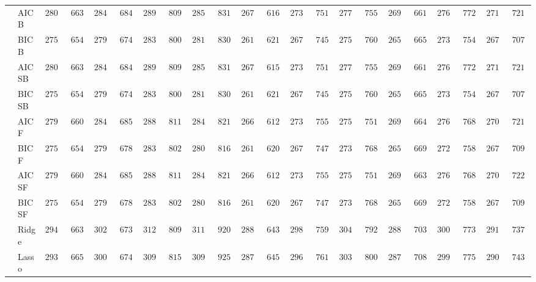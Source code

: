 \begin{tabular}{p{0.2cm}p{1cm}|p{0.6cm}p{0.6cm}|p{0.6cm}p{0.6cm}p{0.6cm}p{0.6cm}p{0.6cm}p{0.6cm}|p{0.6cm}p{0.6cm}p{0.6cm}p{0.6cm}p{0.6cm}p{0.6cm}|p{0.6cm}p{0.6cm}p{0.6cm}p{0.6cm}p{0.6cm}p{0.6cm}}
 & AIC B  & $2801.08$ & $663.10$ & $2847.87$ & $684.89$ & $2898.66$ & $809.57$ & $2857.72$ & $831.74$ & $2673.40$ & $616.50$ & $2738.28$ & $751.61$ & $2775.52$ & $755.02$ & $2699.04$ & $661.89$ & $2765.32$ & $772.39$ & $2714.70$ & $721.42$ \\
 & BIC B  & $2750.01$ & $654.65$ & $2796.68$ & $674.66$ & $2839.12$ & $800.56$ & $2819.68$ & $830.54$ & $2613.25$ & $621.72$ & $2675.47$ & $745.26$ & $2756.36$ & $760.71$ & $2656.22$ & $665.34$ & $2732.05$ & $754.82$ & $2677.76$ & $707.14$ \\
 & AIC SB  & $2801.08$ & $663.10$ & $2847.87$ & $684.89$ & $2898.66$ & $809.57$ & $2857.72$ & $831.74$ & $2674.60$ & $615.79$ & $2738.28$ & $751.61$ & $2775.52$ & $755.02$ & $2699.04$ & $661.89$ & $2765.32$ & $772.39$ & $2714.70$ & $721.42$ \\
 & BIC SB  & $2750.01$ & $654.65$ & $2796.68$ & $674.66$ & $2839.12$ & $800.56$ & $2819.68$ & $830.54$ & $2613.25$ & $621.72$ & $2675.73$ & $745.46$ & $2756.36$ & $760.71$ & $2656.22$ & $665.34$ & $2732.05$ & $754.82$ & $2677.76$ & $707.14$ \\
 & AIC F  & $2798.82$ & $660.67$ & $2847.51$ & $685.20$ & $2889.62$ & $811.86$ & $2848.40$ & $821.62$ & $2669.40$ & $612.51$ & $2730.16$ & $755.99$ & $2753.01$ & $751.17$ & $2696.02$ & $664.00$ & $2761.24$ & $768.80$ & $2700.88$ & $721.60$ \\
 & BIC F  & $2750.01$ & $654.65$ & $2797.16$ & $678.32$ & $2835.04$ & $802.82$ & $2807.31$ & $816.88$ & $2611.69$ & $620.24$ & $2672.55$ & $747.10$ & $2731.89$ & $768.30$ & $2654.23$ & $669.02$ & $2727.40$ & $758.85$ & $2671.09$ & $709.06$ \\
 & AIC SF  & $2798.82$ & $660.67$ & $2847.51$ & $685.20$ & $2889.46$ & $811.96$ & $2848.40$ & $821.62$ & $2669.40$ & $612.51$ & $2730.60$ & $755.93$ & $2751.38$ & $751.00$ & $2695.72$ & $663.91$ & $2761.24$ & $768.80$ & $2702.28$ & $722.86$ \\
 & BIC SF  & $2750.01$ & $654.65$ & $2797.16$ & $678.32$ & $2835.04$ & $802.82$ & $2807.31$ & $816.88$ & $2611.69$ & $620.24$ & $2672.55$ & $747.10$ & $2731.89$ & $768.30$ & $2654.23$ & $669.02$ & $2727.40$ & $758.85$ & $2671.09$ & $709.06$ \\
 & Ridge  & $2949.87$ & $663.09$ & $3028.22$ & $673.07$ & $3120.98$ & $809.59$ & $3111.91$ & $920.28$ & $2881.42$ & $643.36$ & $2980.23$ & $759.95$ & $3049.81$ & $792.40$ & $2888.26$ & $703.58$ & $3005.56$ & $773.77$ & $2916.64$ & $737.94$ \\
 & Lasso  & $2933.37$ & $665.42$ & $3004.25$ & $674.97$ & $3099.63$ & $815.83$ & $3093.25$ & $925.30$ & $2871.14$ & $645.92$ & $2964.88$ & $761.53$ & $3035.75$ & $800.25$ & $2877.75$ & $708.28$ & $2993.85$ & $775.68$ & $2905.24$ & $743.55$ \\

\end{tabular}
